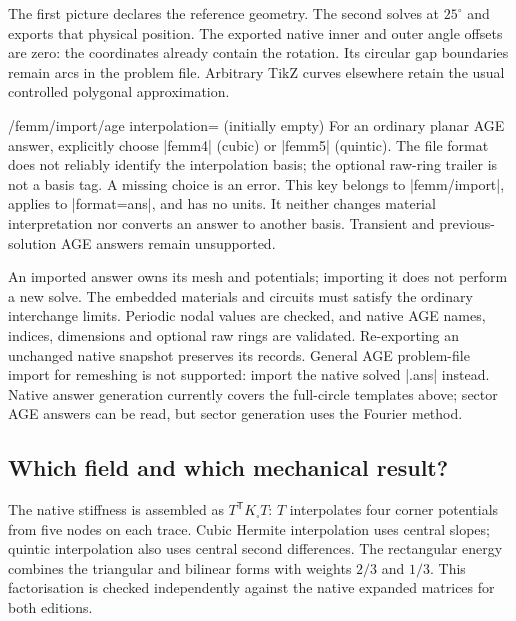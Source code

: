 The first picture declares the reference geometry. The second solves at
$25^\circ$ and exports that physical position. The exported native inner and
outer angle offsets are zero: the coordinates already contain the rotation.
Its circular gap boundaries remain arcs in the problem file. Arbitrary TikZ
curves elsewhere retain the usual controlled polygonal approximation.

\begin{key}{/femm/import/age interpolation= (initially empty)}
For an ordinary planar AGE answer, explicitly choose |femm4| (cubic) or |femm5|
(quintic). The file format does not reliably identify the interpolation basis;
the optional raw-ring trailer is not a basis tag. A missing choice is an error.
This key belongs to |femm/import|, applies to |format=ans|, and has no units.
It neither changes material interpretation nor converts an answer to another
basis. Transient and previous-solution AGE answers remain unsupported.
\end{key}
\begin{codeexample}[]
\end{codeexample}

An imported answer owns its mesh and potentials; importing it does not perform
a new solve. The embedded materials and circuits must satisfy the ordinary
interchange limits. Periodic nodal values are checked, and native AGE names,
indices, dimensions and optional raw rings are validated. Re-exporting an
unchanged native snapshot preserves its records. General AGE problem-file
import for remeshing is not supported: import the native solved |.ans| instead.
Native answer generation currently covers the full-circle templates above;
sector AGE answers can be read, but sector generation uses the Fourier method.

\subsection{Which field and which mechanical result?}
The native stiffness is assembled as $T^\mathsf{T}K_\square T$: $T$ interpolates
four corner potentials from five nodes on each trace. Cubic Hermite interpolation
uses central slopes; quintic interpolation also uses central second differences.
The rectangular energy combines the triangular and bilinear forms with weights
$2/3$ and $1/3$. This factorisation is checked independently against the native
expanded matrices for both editions.

